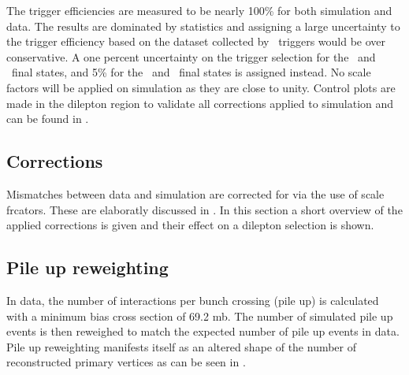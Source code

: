 The trigger efficiencies are measured to be nearly 100\% for both simulation and data. The results are dominated by statistics and assigning a large uncertainty to the trigger efficiency based on the dataset collected by \Etmis\ triggers would be over conservative. A one percent uncertainty on the trigger selection for the \eemu\ and \mumumu\ final states, and 5\% for the \eee\ and \emumu\ final states is assigned instead. No scale factors will be applied on simulation as they are close to unity. Control plots are made in the dilepton region to validate all corrections applied to simulation and can be found in  .

\subsection{Corrections}
\label{sec:corrections}
Mismatches between data and simulation are corrected for via the use of scale frcators. These are elaboratly discussed in . In this section a short overview of the applied corrections is given and their effect on a dilepton selection is shown. 

\subsection*{Pile up reweighting}
In data, the number of interactions per bunch crossing (pile up) is calculated with a minimum bias cross section of 69.2 mb. The number of simulated pile up events is then reweighed to match the expected number of pile up events in data. Pile up reweighting manifests itself as an altered shape of the number of reconstructed primary vertices as can be seen in .

